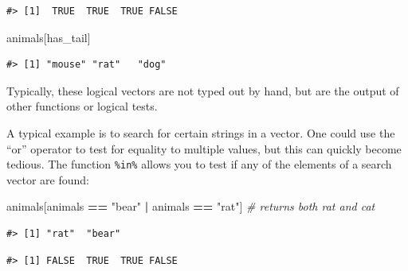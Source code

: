\documentclass[]{book}
\newenvironment{Shaded}{\begin{snugshade}}{\end{snugshade}}
\newcommand{\KeywordTok}[1]{\textcolor[rgb]{0.13,0.29,0.53}{\textbf{#1}}}
\newcommand{\StringTok}[1]{\textcolor[rgb]{0.31,0.60,0.02}{#1}}
\newcommand{\CommentTok}[1]{\textcolor[rgb]{0.56,0.35,0.01}{\textit{#1}}}
\newcommand{\OperatorTok}[1]{\textcolor[rgb]{0.81,0.36,0.00}{\textbf{#1}}}
\newcommand{\NormalTok}[1]{#1}
\theoremstyle{definition}
\theoremstyle{definition}
\theoremstyle{remark}
\begin{document}
\begin{verbatim}
#> [1]  TRUE  TRUE  TRUE FALSE
\end{verbatim}

\begin{Shaded}
\begin{Highlighting}[]
\NormalTok{animals[has_tail]}
\end{Highlighting}
\end{Shaded}

\begin{verbatim}
#> [1] "mouse" "rat"   "dog"
\end{verbatim}

Typically, these logical vectors are not typed out by hand, but are the
output of other functions or logical tests.

A typical example is to search for certain strings in a vector. One
could use the ``or'' operator \texttt{\textbar{}} to test for equality
to multiple values, but this can quickly become tedious. The function
\texttt{\%in\%} allows you to test if any of the elements of a search
vector are found:

\begin{Shaded}
\begin{Highlighting}[]
\NormalTok{animals[animals }\OperatorTok{==}\StringTok{ "bear"} \OperatorTok{|}\StringTok{ }\NormalTok{animals }\OperatorTok{==}\StringTok{ "rat"}\NormalTok{] }\CommentTok{# returns both rat and cat}
\end{Highlighting}
\end{Shaded}

\begin{verbatim}
#> [1] "rat"  "bear"
\end{verbatim}

\begin{Shaded}
\end{Shaded}

\begin{verbatim}
#> [1] FALSE  TRUE  TRUE FALSE
\end{verbatim}

\begin{Shaded}
\end{Shaded}
\end{document}
